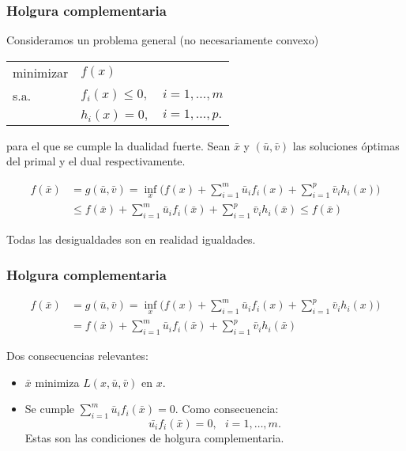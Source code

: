\documentclass{beamer}
\begin{document}
\begin{frame}
\frametitle{Holgura complementaria}

Consideramos un problema general (no necesariamente convexo)
\begin{center}
\begin{tabular}{lll}
minimizar & $f(x)$ \\
s.a. & $f_i(x)\leq 0,$  &  $i=1,\ldots,m$ \\
	 & $h_i(x) = 0,$  &  $i=1,\ldots,p.$
\end{tabular}
\end{center}
para el que se cumple la dualidad fuerte. Sean $\bar{x}$ y $(\bar{u},\bar{v})$ las soluciones óptimas del primal y el dual respectivamente.

\begin{align*}
f(\bar{x}) &= g(\bar{u},\bar{v}) = \inf_x \big(f(x) + \sum_{i=1}^m \bar{u}_i f_i(x) + \sum_{i=1}^p \bar{v}_i h_i(x) \big)\\
&\leq f(\bar{x}) + \sum_{i=1}^m \bar{u}_i f_i(\bar{x}) + \sum_{i=1}^p \bar{v}_i h_i(\bar{x}) \leq f(\bar{x})
\end{align*}


Todas las desigualdades son en realidad igualdades.


\end{frame}
\begin{frame}
\frametitle{Holgura complementaria}



\begin{align*}
f(\bar{x}) &= g(\bar{u},\bar{v}) = \inf_x \big(f(x) + \sum_{i=1}^m \bar{u}_i f_i(x) + \sum_{i=1}^p \bar{v}_i h_i(x) \big)\\
&= f(\bar{x}) + \sum_{i=1}^m \bar{u}_i f_i(\bar{x}) + \sum_{i=1}^p \bar{v}_i h_i(\bar{x}) 
\end{align*}



Dos consecuencias relevantes:

\begin{itemize}
\item $\bar{x}$ minimiza $L(x,\bar{u},\bar{v})$ en $x$.

\item Se cumple $\sum_{i=1}^m \bar{u}_i f_i(\bar{x})=0$. Como consecuencia:
\[
\bar{u_i} f_i(\bar{x}) = 0, \ \ \ i=1,\ldots,m.
\]
Estas son las condiciones de holgura complementaria.
\end{itemize}


\end{frame}
\end{document}
